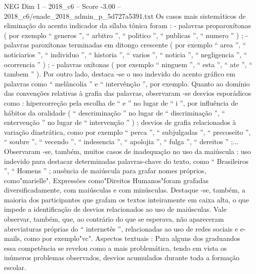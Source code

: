 \begin{textsample}{NEG Dim 1 – 2018\_c6 – Score -3.00 – 2018\_c6/enade\_2018\_admin\_p\_5d727a5391.txt}
Os casos mais sistemáticos de eliminação do acento indicador da sílaba tônica foram : - palavras proparoxítonas ( por exemplo “ generos ”, “ arbitro ”, “ politico ”, “ publicas ”, “ numero ” ) ; - palavras paroxítonas terminadas em ditongo crescente ( por exemplo “ area ”, “ noticiarios ”, “ individuo ”, “ historia ”, “ varios ”, “ noticia ”, “ negligencia ”, “ ocorrencia ” ) ; - palavras oxítonas ( por exemplo “ ninguem ”, “ esta ”, “ ate ”, “ tambem ” ).
Por outro lado, destaca -se o uso indevido do acento gráfico em palavras como “ melâncolia ” e “ intervênção ”, por exemplo.
Quanto ao domínio das convenções relativas à grafia das palavras, observaram -se desvios esporádicos como : hipercorreção pela escolha de “ e ” no lugar de “ i ”, por influência de hábitos da oralidade ( “ descriminação ” no lugar de “ discriminação ”, “ entervenção ” no lugar de “ intervenção ” ) ; desvios de grafia relacionados à variação diastrática, como por exemplo “ perca ”, “ subjulgadas ”, “ precoseito ”, “ soubre ”, “ vecendo ”, “ indesencia ”, “ apolojia ”, “ fulga ”, “ dereitos ” ;...
Observaram -se, também, muitos casos de inadequação no uso da maiúscula : uso indevido para destacar determinadas palavras-chave do texto, como “ Brasileiros ”, “ Homens ” ; ausência de maiúscula para grafar nomes próprios, como"marielle".
Expressões como"Direitos Humanos"foram grafadas diversificadamente, com maiúsculas e com minúsculas.
Destaque -se, também, a maioria dos participantes que grafam os textos inteiramente em caixa alta, o que impede a identificação de desvios relacionados ao uso de maiúsculas.
Vale observar, também, que, ao contrário do que se esperava, não apareceram abreviaturas próprias do “ internetês ”, relacionadas ao uso de redes sociais e e-mails, como por exemplo"vc".
Aspectos textuais : Para alguns dos graduandos essa competência se revelou como a mais problemática, tendo em vista os inúmeros problemas observados, desvios acumulados durante toda a formação escolar.

\end{textsample}
